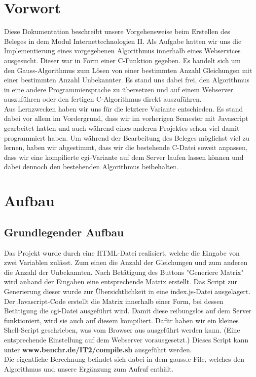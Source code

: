 \documentclass[a4paper,oneside,titlepage,12pt]{article}
\begin{document}
\section{Vorwort}
Diese Dokumentation beschreibt unsere Vorgehensweise beim Erstellen des Beleges in dem Modul Internettechnologien II. Als Aufgabe hatten wir uns die Implementierung eines vorgegebenen Algorithmus innerhalb eines Webservices ausgesucht. Dieser war in Form einer C-Funktion gegeben. Es handelt sich um den Gauss-Algorithmus zum Lösen von einer bestimmten Anzahl Gleichungen mit einer bestimmten Anzahl Unbekannter. Es stand uns dabei frei, den Algorithmus in eine andere Programmiersprache zu übersetzen und auf einem Webserver auszuführen oder den fertigen C-Algorithmus direkt auszuführen. \\ Aus Lernzwecken haben wir uns für die letztere Variante entschieden. Es stand dabei vor allem im Vordergrund, dass wir im vorherigen Semester mit Javascript gearbeitet hatten und auch während eines anderen Projektes schon viel damit programmiert haben. Um während der Bearbeitung des Beleges möglichst viel zu lernen, haben wir abgestimmt, dass wir die bestehende C-Datei soweit anpassen, dass wir eine kompilierte cgi-Variante auf dem Server laufen lassen können und dabei dennoch den bestehenden Algorithmus beibehalten.
\clearpage

\section{Aufbau}
\subsection{Grundlegender Aufbau}
Das Projekt wurde durch eine HTML-Datei realisiert, welche die Eingabe von zwei Variablen zulässt. Zum einen die Anzahl der Gleichungen und zum anderen die Anzahl der Unbekannten. Nach Betätigung des Buttons "Generiere Matrix" wird anhand der Eingaben eine entsprechende Matrix erstellt. Das Script zur Generierung dieser wurde zur Übersichtlichkeit in eine index.js-Datei ausgelagert.\\ Der Javascript-Code erstellt die Matrix innerhalb einer Form, bei dessen Betätigung die cgi-Datei ausgeführt wird. Damit diese reibungslos auf dem Server funktioniert, wird sie auch auf diesem kompiliert. Dafür haben wir ein kleines Shell-Script geschrieben, was vom Browser aus ausgeführt werden kann. (Eine entsprechende Einstellung auf dem Webserver vorausgesetzt.) Dieses Script kann unter \textbf{www.benchr.de/IT2/compile.sh} ausgeführt werden. \\ Die eigentliche Berechnung befindet sich dabei in dem gauss.c-File, welches den Algorithmus und unsere Ergänzung zum Aufruf enthält.
\end{document}
